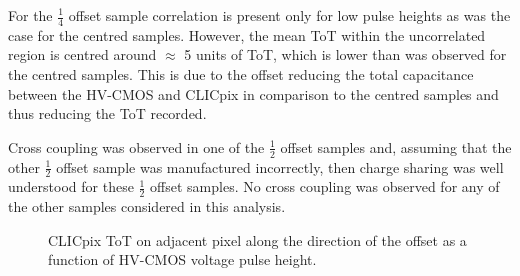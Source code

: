 For the $\frac{1}{4}$ offset sample correlation is present only for low pulse heights as was the case for the centred samples.  However, the mean ToT within the uncorrelated region is centred around $\approx$ 5 units of ToT, which is lower than was observed for the centred samples.  This is due to the offset reducing the total capacitance between the HV-CMOS and CLICpix in comparison to the centred samples and thus reducing the ToT recorded.

Cross coupling was observed in one of the $\frac{1}{2}$ offset samples and, assuming that the other $\frac{1}{2}$ offset sample was manufactured incorrectly, then charge sharing was well understood for these $\frac{1}{2}$ offset samples.  No cross coupling was observed for any of the other samples considered in this analysis.  

\begin{figure}
\centering
{}\hfill
{}
\label{fig:totcrosscoupling}
\caption[CLICpix ToT on adjacent pixel along the direction of the offset as a function of HV-CMOS voltage pulse height.]{CLICpix ToT on adjacent pixel along the direction of the offset as a function of HV-CMOS voltage pulse height.}
\end{figure}

